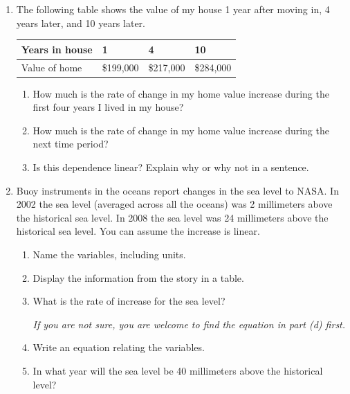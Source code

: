 \documentclass[12pt]{article}
\begin{document}
\begin{enumerate}

\item The following table shows the value of my house 1 year after moving in, 4 years later, and 10 years later.

\begin{center}
\begin{tabular} {|l||l|l|l|} \hline
Years in house & 1 & 4 & 10  \\ \hline
Value of home & \$199,000 & \$217,000 & \$284,000 \\ \hline
\end{tabular}
\end{center}

\begin{enumerate}
\item How much is the rate of change in my home value increase during the first four years I lived in my house?
\vfill
\item How much is the rate of change in my home value increase during the next time period?
\vfill
\item Is this dependence linear? Explain why or why not in a sentence.
\vfill
\end{enumerate}
\newpage %

\item Buoy instruments in the oceans report changes in the sea level to NASA.  In 2002 the sea level (averaged across all the oceans) was 2 millimeters above the historical sea level.  In 2008 the sea level was 24 millimeters above the historical sea level.  You can assume the increase is linear.

\begin{enumerate}
\item Name the variables, including units.
\vfill
\item Display the information from the story in a table.
\vfill
\item What is the rate of increase for the sea level?

\emph{If you are not sure, you are welcome to find the equation in part (d) first.}
\vfill
\item Write an equation relating the variables.
\vfill
\item In what year will the sea level be 40 millimeters above the historical level?
\vfill
\end{enumerate}


\end{enumerate}
\end{document}
